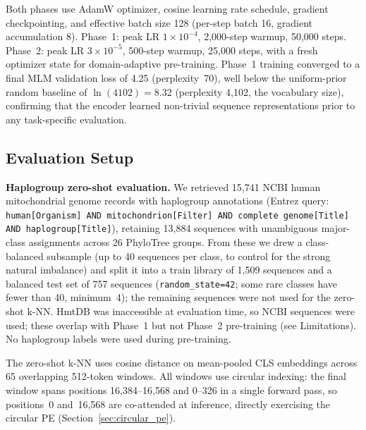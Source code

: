 \documentclass[10pt]{article}
\begin{document}
Both phases use AdamW optimizer, cosine learning rate schedule, gradient checkpointing, and
effective batch size 128 (per-step batch 16, gradient accumulation 8). Phase~1: peak LR
$1\times10^{-4}$, 2,000-step warmup, 50,000 steps. Phase~2: peak LR $3\times10^{-5}$,
500-step warmup, 25,000 steps, with a fresh optimizer state for domain-adaptive pre-training.
Phase~1 training converged to a final MLM validation loss of 4.25 (perplexity~70), well below
the uniform-prior random baseline of $\ln(4102) = 8.32$ (perplexity 4,102, the vocabulary size),
confirming that the encoder learned non-trivial sequence representations prior
to any task-specific evaluation.


\subsection{Evaluation Setup}
\label{sec:eval_setup}

\textbf{Haplogroup zero-shot evaluation.} We retrieved 15,741 NCBI human mitochondrial genome
records with haplogroup annotations (Entrez query: \texttt{human[Organism] AND
mitochondrion[Filter] AND complete genome[Title] AND haplogroup[Title]}), retaining 13,884
sequences with unambiguous major-class assignments across 26 PhyloTree groups. From these we drew
a class-balanced subsample (up to 40 sequences per class, to control for the strong natural
imbalance) and split it into a train library of 1,509 sequences and a balanced test set of 757
sequences (\texttt{random\_state=42}; some rare classes have fewer than 40, minimum~4); the
remaining sequences were not used for the zero-shot k-NN.
HmtDB was inaccessible at evaluation time, so NCBI sequences were used; these overlap with
Phase~1 but not Phase~2 pre-training (see Limitations). No haplogroup labels were used during
pre-training.

The zero-shot k-NN uses cosine distance on mean-pooled CLS embeddings across 65 overlapping
512-token windows. All windows use circular indexing: the final window spans positions
16,384--16,568 and 0--326 in a single forward pass, so positions~0 and~16,568 are co-attended
at inference, directly exercising the circular PE (Section~\ref{sec:circular_pe}).
\end{document}
